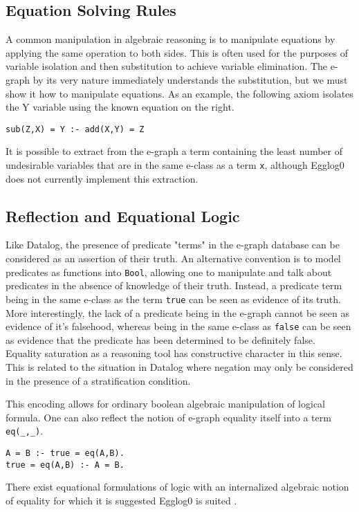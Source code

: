 \documentclass[sigplan,10pt,review]{acmart} %
\begin{document}
\subsection{Equation Solving Rules}
A common manipulation in algebraic reasoning is to manipulate equations by applying the same operation to both sides. This is often used for the purposes of variable isolation and then substitution to achieve variable elimination. The e-graph by its very nature immediately understands the substitution, but we must show it how to manipulate equations. As an example, the following axiom isolates the Y variable using the known equation on the right. 
\begin{lstlisting}
sub(Z,X) = Y :- add(X,Y) = Z
\end{lstlisting}

It is possible to extract from the e-graph a term containing the least number of undesirable variables that are in the same e-class as a term \lstinline{x}, although Egglog0 does not currently implement this extraction.

\subsection{Reflection and Equational Logic}
Like Datalog, the presence of predicate "terms" in the e-graph database can be considered as an assertion of their truth. An alternative convention is to model predicates as functions into \lstinline{Bool}, allowing one to manipulate and talk about predicates in the absence of knowledge of their truth. Instead, a predicate term being in the same e-class as the term \lstinline{true} can be seen as evidence of its truth. More interestingly, the lack of a predicate being in the e-graph cannot be seen as evidence of it's falsehood, whereas being in the same e-class as \lstinline{false} can be seen as evidence that the predicate has been determined to be definitely false. Equality saturation as a reasoning tool has constructive character in this sense. This is related to the situation in Datalog where negation may only be considered in the presence of a stratification condition.

This encoding allows for ordinary boolean algebraic manipulation of logical formula.
One can also reflect the notion of e-graph equality itself into a term \lstinline{eq(_,_)}.

\begin{lstlisting}
A = B :- true = eq(A,B).
true = eq(A,B) :- A = B.

\end{lstlisting}
There exist equational formulations of logic with an internalized algebraic notion of equality for which it is suggested Egglog0 is suited \cite{Dijkstra1990, Gries1993}.
\end{document}
